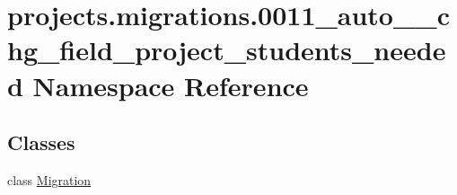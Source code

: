 \hypertarget{namespaceprojects_1_1migrations_1_10011__auto____chg__field__project__students__needed}{\section{projects.\-migrations.0011\-\_\-auto\-\_\-\-\_\-chg\-\_\-field\-\_\-project\-\_\-students\-\_\-needed Namespace Reference}
\label{namespaceprojects_1_1migrations_1_10011__auto____chg__field__project__students__needed}
}
\subsection*{Classes}
\begin{DoxyCompactItemize}
\item 
class \hyperlink{classprojects_1_1migrations_1_10011__auto____chg__field__project__students__needed_1_1_migration}{Migration}
\end{DoxyCompactItemize}
